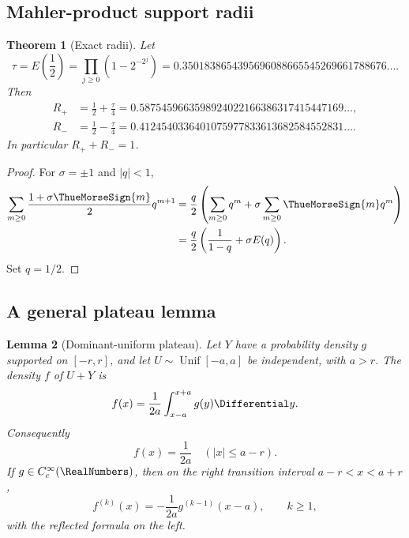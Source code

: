 \documentclass[11pt,oneside]{article}
\numberwithin{equation}{section}
\newtheorem{theorem}{Theorem}[section]
\newtheorem{lemma}[theorem]{Lemma}
\theoremstyle{definition}
\theoremstyle{remark}
\begin{document}
\subsection{Mahler-product support radii}

\begin{theorem}[Exact radii]
\label{thm:radii}
Let
\begin{equation}
 \tau=E\!\left(\frac12\right)
 =\prod_{j\ge0}\left(1-2^{-2^j}\right)
 =0.3501838654395696088665545269661788676\ldots.
 \label{eq:tau}
\end{equation}
Then
\begin{equation}
 \begin{aligned}
 R_+&=\frac12+\frac\tau4
      =0.5875459663598924022166386317415447169\ldots,\\
 R_-&=\frac12-\frac\tau4
      =0.4124540336401075977833613682584552831\ldots.
 \end{aligned}
 \label{eq:radii}
\end{equation}
In particular $R_++R_-=1$.
\end{theorem}

\begin{proof}
For $\sigma=\pm1$ and $|q|<1$,
\begin{align}
 \sum_{m\ge0}\frac{1+\sigma\ThueMorseSign{m}}{2}q^{m+1}
 &=\frac q2\left(\sum_{m\ge0}q^m+
       \sigma\sum_{m\ge0}\ThueMorseSign{m}q^m\right)\\
 &=\frac q2\left(\frac1{1-q}+\sigma E(q)\right).
 \label{eq:selector-generating}
\end{align}
Set $q=1/2$.
\end{proof}

\subsection{A general plateau lemma}

\begin{lemma}[Dominant-uniform plateau]
\label{lem:plateau}
Let $Y$ have a probability density $g$ supported on $[-r,r]$, and let
$U\sim\operatorname{Unif}[-a,a]$ be independent, with $a>r$.  The density $f$ of $U+Y$
is
\begin{equation}
 f(x)=\frac1{2a}\int_{x-a}^{x+a}g(y)\Differential y.
 \label{eq:plateau-convolution}
\end{equation}
Consequently
\begin{equation}
 f(x)=\frac1{2a}\quad (|x|\le a-r).
 \label{eq:plateau-general}
\end{equation}
If $g\in C^\infty_c(\RealNumbers)$, then on the right transition interval $a-r<x<a+r$,
\begin{equation}
 f^{(k)}(x)=-\frac1{2a}g^{(k-1)}(x-a),\qquad k\ge1,
 \label{eq:plateau-edge-derivative}
\end{equation}
with the reflected formula on the left.
\end{lemma}
\end{document}
